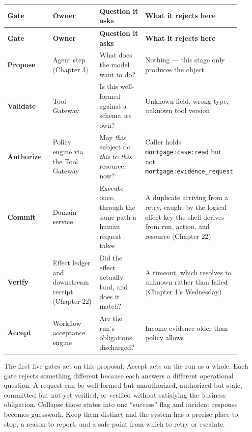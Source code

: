 \BookTableStart
\fontsize{7.2}{9}\selectfont
\begin{longtable}{@{}Y{0.2350\linewidth}Y{0.2350\linewidth}Y{0.2350\linewidth}Y{0.2350\linewidth}@{}}
\color{white}\bfseries Gate & \color{white}\bfseries Owner & \color{white}\bfseries Question it asks & \color{white}\bfseries What it rejects here \\
\endfirsthead
{}
\color{white}\bfseries Gate & \color{white}\bfseries Owner & \color{white}\bfseries Question it asks & \color{white}\bfseries What it rejects here \\
\endhead
\textbf{Propose} & Agent step (Chapter 3) & What does the model want to do? & Nothing — this stage only produces the object \\
\textbf{Validate} & Tool Gateway & Is this well-formed against a schema \emph{we} own? & Unknown field, wrong type, unknown tool version \\
\textbf{Authorize} & Policy engine via the Tool Gateway & May \emph{this} subject do \emph{this} to \emph{this} resource, now? & Caller holds \lstinline[style=bookinline]!mortgage:case:read! but not \lstinline[style=bookinline]!mortgage:evidence_request! \\
\textbf{Commit} & Domain service & Execute once, through the same path a human request takes & A duplicate arriving from a retry, caught by the logical effect key the shell derives from run, action, and resource (Chapter 22) \\
\textbf{Verify} & Effect ledger and downstream receipt (Chapter 22) & Did the effect actually land, and does it match? & A timeout, which resolves to unknown rather than failed (Chapter 1's Wednesday) \\
\textbf{Accept} & Workflow acceptance engine & Are the run's obligations discharged? & Income evidence older than policy allows \\
\end{longtable}
\BookTableEnd

The first five gates act on this proposal; Accept acts on the run as a whole. Each gate rejects something different because each answers a different operational question. A request can be well formed but unauthorized, authorized but stale, committed but not yet verified, or verified without satisfying the business obligation. Collapse those states into one “success” flag and incident response becomes guesswork. Keep them distinct and the system has a precise place to stop, a reason to report, and a safe point from which to retry or escalate.\par


